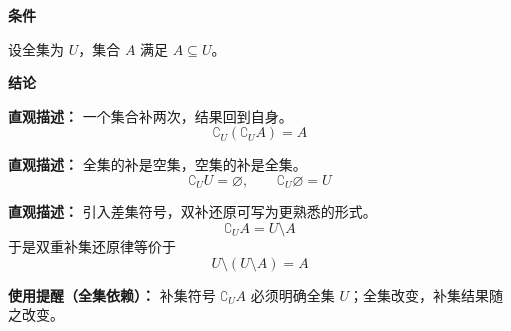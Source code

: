 \begin{statementbox}

	\textbf{\textcolor{CStatement}{条件}}
	\begin{description}[style=nextline, leftmargin=2.8em, labelsep=0.5em, itemsep=0.35em]
		\item[\textbf{\textcolor{CStatement}{条件 1（全集给定）：}}] 设全集为 $U$，集合 $A$ 满足 $A \subseteq U$。
	\end{description}

	\textbf{\textcolor{CStatement}{结论}}
	\begin{description}[style=nextline, leftmargin=2.8em, labelsep=0.5em, itemsep=0.45em]
		\item[\textbf{\textcolor{CStatement}{结论一（双重补集）：}}]
			\textbf{\textcolor{CStatement}{直观描述：}}
			一个集合补两次，结果回到自身。
			\[
				\complement_U(\complement_U A) = A
			\]

		\item[\textbf{\textcolor{CStatement}{结论二（边界补集）：}}]
			\textbf{\textcolor{CStatement}{直观描述：}}
			全集的补是空集，空集的补是全集。
			\[
				\complement_U U = \varnothing,
				\qquad
				\complement_U \varnothing = U
			\]

		\item[\textbf{\textcolor{CStatement}{常见变形（差集形式）：}}]
			\textbf{\textcolor{CStatement}{直观描述：}}
			引入差集符号，双补还原可写为更熟悉的形式。
			\[
				\complement_U A = U \setminus A
			\]
			于是双重补集还原律等价于
			\[
				U \setminus (U \setminus A) = A
			\]
	\end{description}

	\textbf{\textcolor{CStatement}{使用提醒（全集依赖）：}}
	补集符号 $\complement_U A$ 必须明确全集 $U$；全集改变，补集结果随之改变。

\end{statementbox}
